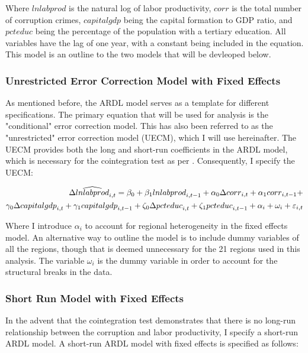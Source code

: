 \documentclass[12pt]{article} %
\begin{document}
Where $lnlabprod$ is the natural log of labor productivity, $corr$ is the total number of corruption crimes, $capitalgdp$ being the capital formation to GDP ratio, and $pcteduc$ being the percentage of the population with a tertiary education. All variables have the lag of one year, with a constant being included in the equation. This model is an outline to the two models that will be devleoped below.

%
\subsubsection*{Unrestricted Error Correction Model with Fixed Effects}

As mentioned before, the ARDL model serves as a template for different specifications. The primary equation that will be used for analysis is the "conditional" error correction model. This has also been referred to as the "unrestricted" error correction model (UECM), which I will use hereinafter. The UECM provides both the long and short-run coefficients in the ARDL model, which is necessary for the cointegration test as per \citet{pesaran_bounds_2001}. Consequently, I specify the UECM:

\begin{equation} \label{eu_eqn}
	\begin{aligned} 
	\noindent 
	\Delta\widehat{lnlabprod}_{i,t} = \beta_{0}+\beta_{1}{lnlabprod}_{i,t-1} +\alpha_{0}\Delta{corr}_{i,t} + \alpha_{1}{corr}_{i,t-1} +\\
	\gamma_0\Delta{capitalgdp}_{i,t}+
	\gamma_1{capitalgdp}_{i,t-1} + \zeta_{0}\Delta{pcteduc}_{i,t}+\zeta_1{pcteduc}_{i,t-1} + \alpha_{i} + \omega_{i} + \varepsilon_{i,t}
	\end{aligned}
\end{equation} 

Where I introduce $\alpha_{i}$ to account for regional heterogeneity in the fixed effects model. An alternative way to outline the model is to include dummy variables of all the regions, though that is deemed unnecessary for the 21 regions used in this analysis. The variable $\omega_{i}$ is the dummy variable in order to account for the structural breaks in the data.


\subsubsection*{Short Run Model with Fixed Effects}

In the advent that the cointegration test demonstrates that there is no long-run relationship between the corruption and labor productivity, I specify a short-run ARDL model. A short-run ARDL model with fixed effects is specified as follows: 
\end{document}
